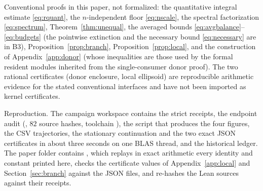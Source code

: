 \documentclass[11pt,a4paper]{article}
\theoremstyle{plain}
\theoremstyle{definition}
\theoremstyle{remark}
\begin{document}
Conventional proofs in this paper, not formalized: the quantitative integral estimate \eqref{eq:rquant}, the $n$-independent floor \eqref{eq:nscale}, the spectral factorization \eqref{eq:spectrum}, Theorem~\ref{thm:unequal}, the averaged bounds \eqref{eq:avgbalance}--\eqref{eq:budgets} (the pointwise extinction and the necessary bound \eqref{eq:necessary} are in B3), Proposition~\ref{prop:branch}, Proposition~\ref{prop:local}, and the construction of Appendix~\ref{app:donor} (whose inequalities are those used by the formal resident modules inherited from the single-consumer donor proof). The two rational certificates (donor enclosure, local ellipsoid) are reproducible arithmetic evidence for the stated conventional interfaces and have not been imported as kernel certificates.

Reproduction. The campaign workspace  contains the strict receipts, the endpoint audit (, $82$ source hashes, toolchain ), the script  that produces the four figures, the CSV trajectories, the stationary continuation and the two exact JSON certificates in about three seconds on one BLAS thread, and the historical ledger. The paper folder contains , which replays in exact arithmetic every identity and constant printed here, checks the certificate values of Appendix~\ref{app:local} and Section~\ref{sec:branch} against the JSON files, and re-hashes the Lean sources against their receipts.



\end{document}
